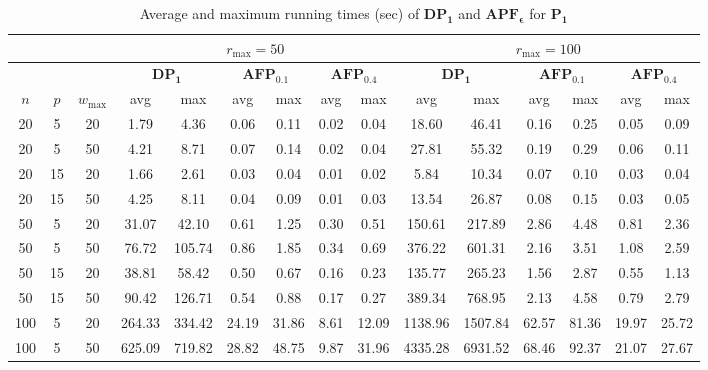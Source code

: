 \documentclass[12pt]{article}
\begin{document}
\begin{sloppypar}
\begin{table}[H]	
\footnotesize  
\setlength{\tabcolsep}{2 pt} %
\caption{Average and maximum running times (sec) of $\mathbf{DP_1}$ and $\mathbf{APF_{\epsilon}}$ for $\mathbf{P_1}$} \label{TA-D1} 
\vspace{-10pt}
\begin{center}
\begin{tabular}{|ccc|cc|cc|cc|cc|cc|cc|}  
\hline
\multicolumn{3}{|c|}{} & \multicolumn{6}{c|}{$r_{\max}=50$} & \multicolumn{6}{c|}{$r_{\max}=100$}\\ \hline
\multicolumn{3}{|c|}{} & \multicolumn{2}{c|}{$\mathbf{DP_1}$} & \multicolumn{2}{c|}{$\mathbf{AFP_{0.1}}$} & \multicolumn{2}{c|}{$\mathbf{AFP_{0.4}}$} & \multicolumn{2}{c|}{$\mathbf{DP_1}$} & \multicolumn{2}{c|}{$\mathbf{AFP_{0.1}}$} & \multicolumn{2}{c|}{$\mathbf{AFP_{0.4}}$} \\ \hline
$n$ & $p$ & $w_{\max}$&   avg & max  & avg & max & avg & max &avg &  max  & avg & max & avg & max \\ \hline 
20 & 5 & 20 & 1.79 & 4.36 &	0.06 & 0.11	& 0.02 & 0.04 & 18.60 & 46.41 & 0.16 & 0.25 & 0.05 & 0.09 \\ \hline
20 & 5 & 50 & 4.21 & 8.71 & 0.07 & 0.14 & 0.02 &	0.04 & 27.81 & 55.32 & 0.19 & 0.29 & 0.06 &	0.11 \\ \hline
20 & 15 & 20 & 1.66 & 2.61 & 0.03 & 0.04 & 0.01 & 0.02 & 5.84 & 10.34 & 0.07 & 0.10 & 0.03 & 0.04 \\ \hline
20 & 15 & 50 & 4.25 & 8.11 & 0.04 & 0.09 & 0.01 & 0.03 & 13.54 & 26.87 & 0.08 & 0.15	& 0.03 & 0.05 \\ \hline
50 & 5 & 20 & 31.07	& 42.10 & 0.61 & 1.25 & 0.30 & 0.51 & 150.61 & 217.89 & 2.86 & 4.48 & 0.81 &	2.36 \\ \hline
50 & 5 & 50 & 76.72	& 105.74 & 0.86 & 1.85 & 0.34 &	0.69 & 376.22 &	601.31 & 2.16 &	3.51 & 1.08	& 2.59 \\ \hline
50 & 15 & 20 & 38.81 & 58.42 & 0.50 & 0.67 &	0.16 & 0.23 & 135.77 & 265.23 & 1.56 & 2.87	& 0.55 & 1.13 \\ \hline
50 & 15 & 50 & 90.42 & 126.71 & 0.54 & 0.88 &	0.17 & 0.27 & 389.34 & 768.95 &	2.13 & 4.58 & 0.79 & 2.79 \\ \hline 
100 & 5 & 20 & 264.33 &	334.42 & 24.19 & 31.86 & 8.61 &	12.09 & 1138.96 & 1507.84 &	62.57 &	81.36 &	19.97 &	25.72 \\ \hline
100 & 5 & 50 & 625.09 &	719.82 & 28.82 & 48.75 & 9.87 &	31.96 & 4335.28 & 6931.52 & 68.46 &	92.37 & 21.07 &	27.67 \\ \hline

\end{tabular}
\end{center}
\end{table}
\end{sloppypar}
\end{document}
